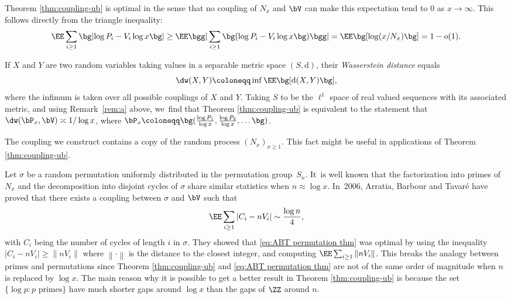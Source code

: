 \skpt
\begin{remss}
\begin{enumeratea}
\item\label{rem:a}
Theorem \ref{thm:coupling-ub} is optimal in the sense that no coupling of $N_x$ and $\bV$ can make this expectation tend to $0$ as $x \to \infty$. This follows directly from the triangle inequality:
\[
\EE \sum_{i \ge 1} \bg|{\log P_i - V_i\log x}\bg| \ge \EE \bgg|\sum_{i \ge 1} \bg(\log P_i - V_i\log x\bg)\bgg| = \EE \bg[\log(x/N_x)\bg] = 1-o(1).
\]

\item\label{rem:b}
If $X$ and $Y$ are two random variables taking values in a separable metric space $(S,\mathrm{d})$, their {\it Wasserstein distance} equals
\begin{equation}
\label{eq:def wasserstein}
\dw(X,Y) \coloneqq \inf \EE\bg[\mathrm{d}(X,Y)\bg],
\end{equation}
where the infimum is taken over all possible couplings of $X$ and $Y$. Taking $S$ to be the $\ell^1$ space of real valued sequences with its associated metric, and using Remark~\eqref{rem:a} above, we~find that Theorem \ref{thm:coupling-ub} is equivalent to the statement that $\dw(\bP_x, \bV) \asymp1/\log x$, where $\bP_x \coloneqq \bg(\frac{\log P_1}{\log x}, \frac{\log P_2}{\log x}, \ldots\bg)$.

\item\label{rem:c}
The coupling we construct contains a copy of the random process $(N_x)_{x \ge 1}$. This fact might be useful in applications of Theorem \ref{thm:coupling-ub}.

\item\label{rem:d}
Let $\sigma$ be a random permutation uniformly distributed in the permutation group~$S_n$. It~is well known that the factorization into primes of $N_x$ and the decomposition into disjoint cycles of $\sigma$ share similar statistics when $n \approx \log x$. In~2006, Arratia, Barbour and Tavaré \cite{ABT06} have proved that there exists a coupling between $\sigma$ and $\bV$ such that
\begin{equation}
\label{eq:ABT permutation thm}
\EE \sum_{i \ge 1} |C_i - n V_i| \sim \frac{\log n}{4},
\end{equation}
with $C_i$ being the number of cycles of length $i$ in $\sigma$. They showed that \eqref{eq:ABT permutation thm} was optimal by using the inequality $|C_i - nV_i| \ge \|nV_i\|$ where $\left\|\cdot\right\|$ is the distance to the closest integer, and computing $\EE \sum_{i \ge 1} \|nV_i\|$. This breaks the analogy between primes and permutations since Theorem \ref{thm:coupling-ub} and \eqref{eq:ABT permutation thm} are not of the same order of magnitude when $n$ is replaced by $\log x$. The main reason why it is possible to get a better result in Theorem \ref{thm:coupling-ub} is because the set $\{\log p : p \text{ primes}\}$ have much shorter gaps around $\log x$ than the gaps of $\ZZ$ around $n$.
\end{enumeratea}
\end{remss}

